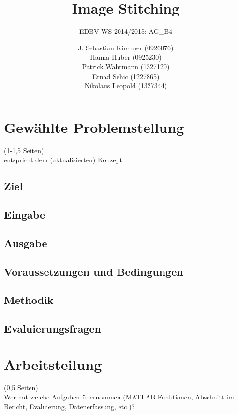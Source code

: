 \documentclass[deutsch]{scrartcl}
\begin{document}
\title{Image Stitching} 

\subtitle{EDBV WS 2014/2015: AG\_B4} 

\author{J. Sebastian Kirchner (0926076)\\
	Hanna Huber (0925230)\\
	Patrick Wahrmann (1327120)\\
	Ernad Sehic (1227865)\\
	Nikolaus Leopold (1327344)}


\maketitle

\section{Gewählte Problemstellung}
(1-1,5 Seiten)\\
entspricht dem (aktualisierten) Konzept
\subsection{Ziel}
\subsection{Eingabe}
\subsection{Ausgabe}
\subsection{Voraussetzungen und Bedingungen}
\subsection{Methodik}
\subsection{Evaluierungsfragen}

\section{Arbeitsteilung}
(0,5 Seiten)\\
Wer hat welche Aufgaben übernommen (MATLAB-Funktionen, Abschnitt im Bericht, Evaluierung, Datenerfassung, etc.)?
\end{document}
